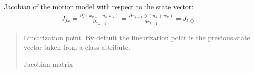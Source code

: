 \documentclass[letterpaper,10pt,english]{sphinxmanual}
\begin{document}
\begin{fulllineitems}
\begin{fulllineitems}
\begin{quote}
\begin{description}
\end{description}\end{quote}

\end{fulllineitems}


\begin{fulllineitems}
\label{\detokenize{GFLocalization:EKF_4DOFAUV_InputVelocityMM_DVLDepthYawOM.EKF_4DOFAUV_InputVelocityMM_DVLDepthYawOM.Jfx}}
\pysigstartsignatures
{}
\pysigstopsignatures
\sphinxAtStartPar
Jacobian of the motion model with respect to the state vector:
\begin{equation}\label{equation:GFLocalization:eq-Jfx-EKF_4DOFAUV_VelocityMM_DVLDepthYawOM}
\begin{split}J_{fx}=\frac{\partial f(x_{k-1},u_k,w_k)}{\partial x_{k-1}} = \frac{\partial x_{k-1} \oplus (u_k + w_k)}{\partial x_{k-1}} = J_{1\oplus}\end{split}
\end{equation}\begin{quote}\begin{description}
\sphinxAtStartPar
{} \textendash{} Linearization point. By default the linearization point is the previous state vector taken from a class attribute.

\sphinxAtStartPar
Jacobian matrix

\end{description}\end{quote}

\end{fulllineitems}



\end{fulllineitems}
\end{document}
